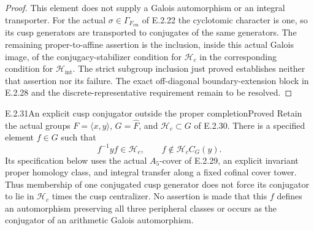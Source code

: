 \begin{proof}
This element does not supply a Galois automorphism or an
integral transporter. For the actual \(\sigma\in\Gamma_{F_{\mathrm{cm}}}\)
of E.2.22 the cyclotomic character is one, so its cusp
generators are transported to conjugates of the same
generators. The remaining proper-to-affine assertion is
the inclusion, inside this actual Galois image, of the
conjugacy-stabilizer condition for \(\mathcal H_c\) in
the corresponding condition for \(\mathcal H_{\mathrm{int}}\).
The strict subgroup inclusion just proved establishes
neither that assertion nor its failure. The exact
off-diagonal boundary-extension block in E.2.28 and the
discrete-representative requirement remain to be resolved.
\end{proof}


\begin{result}{E.2.31}{An explicit cusp conjugator outside the proper completion}{Proved}
Retain the actual groups \(F=\langle x,y\rangle\),
\(G=\widehat F\), and \(\mathcal H_c\subset G\) of E.2.30.
There is a specified element \(f\in G\) such that
\[
 f^{-1}yf\in\mathcal H_c,
 \qquad
 f\notin\mathcal H_c C_G(y).
\tag{E.2.31a}
\]
Its specification below uses the actual \(A_5\)-cover of
E.2.29, an explicit invariant proper homology class, and
integral transfer along a fixed cofinal cover tower. Thus
membership of one conjugated cusp generator does not force
its conjugator to lie in \(\mathcal H_c\) times the cusp
centralizer. No assertion is made that this \(f\) defines an
automorphism preserving all three peripheral classes or
occurs as the conjugator of an arithmetic Galois automorphism.
\end{result}
